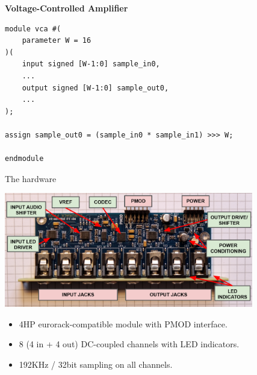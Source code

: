 \documentclass{beamer}
\begin{document}
\begin{frame}[fragile]

    \textbf{Voltage-Controlled Amplifier}

    \begin{verbatim}
module vca #(
    parameter W = 16
)(
    input signed [W-1:0] sample_in0,
    ...
    output signed [W-1:0] sample_out0,
    ...
);

assign sample_out0 = (sample_in0 * sample_in1) >>> W;

endmodule
    \end{verbatim}

\end{frame}

\begin{frame}{The hardware}


    \begin{center}
        \includegraphics[height=5cm]{img/topdown_labelled.png}
    \end{center}

    \begin{itemize}
        \item 4HP eurorack-compatible module with PMOD interface.
        \item 8 (4 in + 4 out) DC-coupled channels with LED indicators.
        \item 192KHz / 32bit sampling on all channels.
    \end{itemize}

\end{frame}
\end{document}
